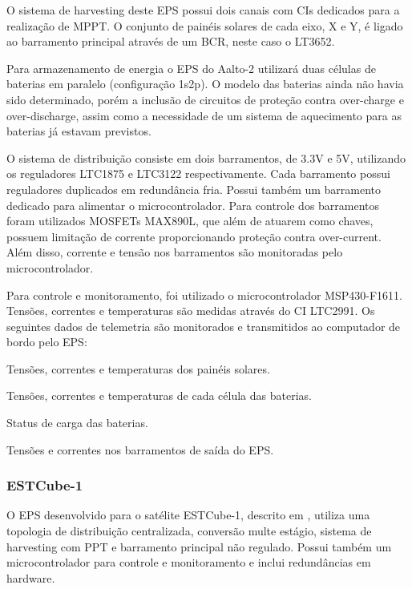 O sistema de harvesting deste \gls{EPS} possui dois canais com CIs dedicados para a realização de \gls{MPPT}. O conjunto de painéis solares de cada eixo, X e Y, é ligado ao barramento principal através de um \gls{BCR}, neste caso o LT3652.

Para armazenamento de energia o EPS do Aalto-2 utilizará duas células de baterias em paralelo (configuração 1s2p). O modelo das baterias ainda não havia sido determinado, porém a inclusão de circuitos de proteção contra over-charge e over-discharge, assim como a necessidade de um sistema de aquecimento para as baterias já estavam previstos.

O sistema de distribuição consiste em dois barramentos, de 3.3V e 5V, utilizando os reguladores LTC1875 e LTC3122 respectivamente.
Cada barramento possui reguladores duplicados em redundância fria.
Possui também um barramento dedicado para alimentar o microcontrolador.
Para controle dos barramentos foram utilizados MOSFETs MAX890L, que além de atuarem como chaves, possuem limitação de corrente proporcionando proteção contra over-current.
Além disso, corrente e tensão nos barramentos são monitoradas pelo microcontrolador.

Para controle e monitoramento, foi utilizado o microcontrolador MSP430-F1611. Tensões, correntes e temperaturas são medidas através do CI LTC2991. Os seguintes dados de telemetria são monitorados e transmitidos ao computador de bordo pelo EPS:
\begin{alineas}
    \item Tensões, correntes e temperaturas dos painéis solares.
    \item Tensões, correntes e temperaturas de cada célula das baterias.
    \item Status de carga das baterias.
    \item Tensões e correntes nos barramentos de saída do EPS.
\end{alineas}


\subsubsection{ESTCube-1}

O \gls{EPS} desenvolvido para o satélite ESTCube-1, descrito em \textcite{estcube-eps}, utiliza uma topologia de distribuição centralizada, conversão multe estágio, sistema de harvesting com \gls{PPT} e barramento principal não regulado.
Possui também um microcontrolador para controle e monitoramento e inclui redundâncias em hardware.

